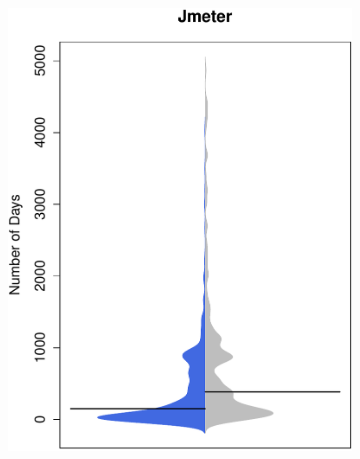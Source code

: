 \begin{figure}[t]
	 	\begin{subfigure}[b]{0.20\textwidth}
	 		\includegraphics[width=\textwidth]{figures/test/jmeter_update.pdf}
	 		\label{fig:removal_comparison_gerrit}
	 	\end{subfigure}
	 	~
	 	~
	 	~
	 	\begin{subfigure}[b]{0.20\textwidth}

\end{subfigure}
\end{figure}
